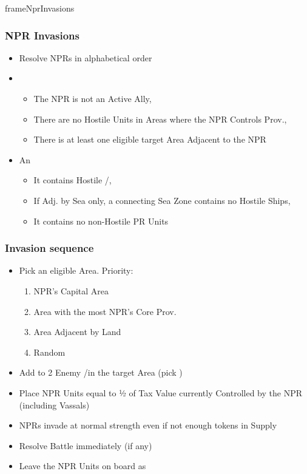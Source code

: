 \documentclass[10pt]{article}
\newlength{\fhPeaceSeq} \setlength\fhPeaceSeq{26.5\baselineskip}
\newlength{\fhNprInvasions} \setlength\fhNprInvasions{\calc{\textheight - \fhPeaceSeq - \frameToFrameSpacing}}
\begin{document}
\addbackground
\addfooter

\begin{dynamiccontents*}{frameNprInvasions}\begin{eubox}{\fhNprInvasions}
	\subsubsection*{NPR Invasions }
	\begin{itemize}
		\item Resolve NPRs in alphabetical order
		\item {}
		\begin{itemize}
			\item The NPR is not an Active Ally, 
			\item There are no Hostile Units in Areas where the NPR Controls Prov., 
			\item There is at least one eligible target Area Adjacent to the NPR
		\end{itemize}
		\item An 
		\begin{itemize}
			\item It contains Hostile \towns/\vassals, 
			\item If Adj. by Sea only, a connecting Sea Zone contains no Hostile Ships, 
			\item It contains no non-Hostile PR Units
		\end{itemize}
	\end{itemize}
	\subsubsection*{Invasion sequence}
	\begin{itemize}
		\item Pick an eligible Area. Priority:
		\begin{enumerate}
			\item NPR's Capital Area
			\item Area with the most NPR's Core Prov.
			\item Area Adjacent by Land
			\item Random
		\end{enumerate}
		\item Add \unrest to 2 Enemy \towns/\vassals in the target Area (pick \az)
		\item Place NPR Units equal to ½ of Tax Value currently Controlled by the NPR (including Vassals)
		\item NPRs invade at normal strength even if not enough tokens in Supply
		\item Resolve Battle immediately (if any)
		\begin{itemize}
		\end{itemize}
		\item Leave the NPR Units on board as \rebels
	\end{itemize}
\end{eubox}\end{dynamiccontents*}
\end{document}
